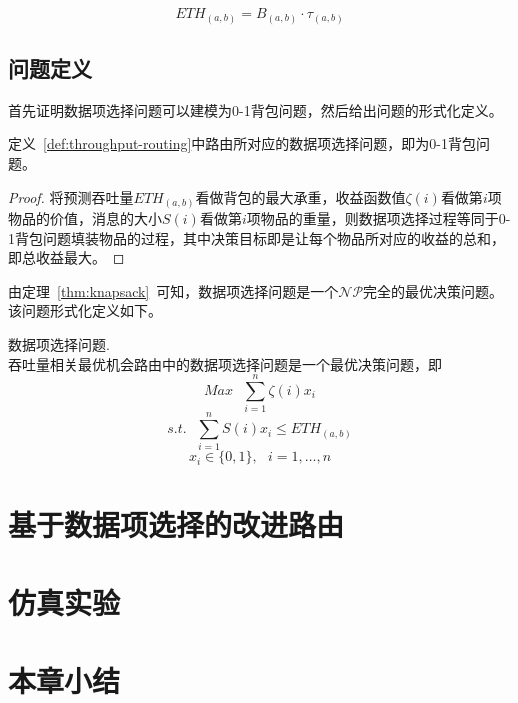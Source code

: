 \begin{equation}
ETH_{(a,b)}=B_{(a,b)}\cdot\tau_{(a,b)}
\label{eq:eth}
\end{equation}

\subsection{问题定义}

首先证明数据项选择问题可以建模为0-1背包问题，然后给出问题的形式化定义。

\begin{theorem}
\label{thm:knapsack}
定义~\ref{def:throughput-routing}中路由所对应的数据项选择问题，即为0-1背包问题。
\end{theorem}
\begin{proof}
将预测吞吐量$ETH_{(a,b)}$看做背包的最大承重，收益函数值$\zeta(i)$看做第$i$项物品的价值，消息的大小$S(i)$看做第$i$项物品的重量，则数据项选择过程等同于0-1背包问题填装物品的过程，其中决策目标即是让每个物品所对应的收益的总和，即总收益最大。
\end{proof}

由定理~\ref{thm:knapsack}~可知，数据项选择问题是一个$\mathcal{NP}$完全的最优决策问题。该问题形式化定义如下。

\begin{definition} 数据项选择问题.\\
吞吐量相关最优机会路由中的数据项选择问题是一个最优决策问题，即
\[
Max~~~\sum_{i=1}^{n}\zeta(i)x_i
\]\[
s.t.~~~\sum_{i=1}^{n}S(i)x_i\leq ETH_{(a,b)}
\]\[
x_i\in \{0,1\},~~~i=1,\ldots,n
\]
\end{definition}

\section{基于数据项选择的改进路由}
\label{chap4:基于数据项选择的改进路由}

\section{仿真实验}
\label{chap4:仿真实验}

\section{本章小结}
\label{chap4:本章小结}
